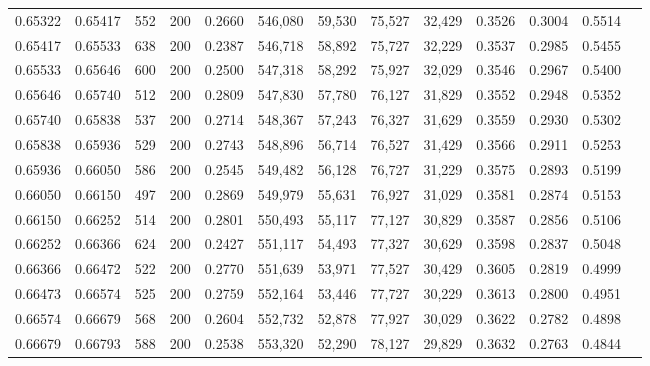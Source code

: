 \begin{tabular}{rrrrrrrrrrrrr}
0.65322 & 0.65417 &   552 & 200 &                                     0.2660 & 546,080 &  59,530 &  75,527 &  32,429 & 0.3526 & 0.3004 & 0.5514 \\
0.65417 & 0.65533 &   638 & 200 &                                     0.2387 & 546,718 &  58,892 &  75,727 &  32,229 & 0.3537 & 0.2985 & 0.5455 \\
0.65533 & 0.65646 &   600 & 200 &                                     0.2500 & 547,318 &  58,292 &  75,927 &  32,029 & 0.3546 & 0.2967 & 0.5400 \\
0.65646 & 0.65740 &   512 & 200 &                                     0.2809 & 547,830 &  57,780 &  76,127 &  31,829 & 0.3552 & 0.2948 & 0.5352 \\
0.65740 & 0.65838 &   537 & 200 &                                     0.2714 & 548,367 &  57,243 &  76,327 &  31,629 & 0.3559 & 0.2930 & 0.5302 \\
0.65838 & 0.65936 &   529 & 200 &                                     0.2743 & 548,896 &  56,714 &  76,527 &  31,429 & 0.3566 & 0.2911 & 0.5253 \\
0.65936 & 0.66050 &   586 & 200 &                                     0.2545 & 549,482 &  56,128 &  76,727 &  31,229 & 0.3575 & 0.2893 & 0.5199 \\
0.66050 & 0.66150 &   497 & 200 &                                     0.2869 & 549,979 &  55,631 &  76,927 &  31,029 & 0.3581 & 0.2874 & 0.5153 \\
0.66150 & 0.66252 &   514 & 200 &                                     0.2801 & 550,493 &  55,117 &  77,127 &  30,829 & 0.3587 & 0.2856 & 0.5106 \\
0.66252 & 0.66366 &   624 & 200 &                                     0.2427 & 551,117 &  54,493 &  77,327 &  30,629 & 0.3598 & 0.2837 & 0.5048 \\
0.66366 & 0.66472 &   522 & 200 &                                     0.2770 & 551,639 &  53,971 &  77,527 &  30,429 & 0.3605 & 0.2819 & 0.4999 \\
0.66473 & 0.66574 &   525 & 200 &                                     0.2759 & 552,164 &  53,446 &  77,727 &  30,229 & 0.3613 & 0.2800 & 0.4951 \\
0.66574 & 0.66679 &   568 & 200 &                                     0.2604 & 552,732 &  52,878 &  77,927 &  30,029 & 0.3622 & 0.2782 & 0.4898 \\
0.66679 & 0.66793 &   588 & 200 &                                     0.2538 & 553,320 &  52,290 &  78,127 &  29,829 & 0.3632 & 0.2763 & 0.4844 \\

\end{tabular}
